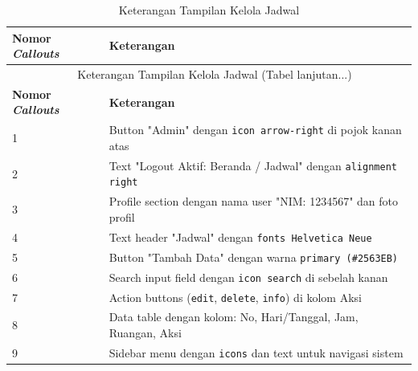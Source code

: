 \begin{enumerate}
	      {
		      \fontsize{10}{13}\selectfont
		      \begin{longtable}{p{4cm} p{9cm}}
			      \caption{Keterangan Tampilan Kelola Jadwal}
			      \label{tab:ui-jadwal}                                                                                           \\
			      \hline
			      \textbf{Nomor \textit{Callouts}} & \textbf{Keterangan}                                                          \\
			      \hline
			      \endfirsthead
			      \multicolumn{2}{c}{\normalsize\tablename\ \textbf{\thetable}\ {Keterangan Tampilan Kelola Jadwal} \space (Tabel lanjutan...)}       \\
			      \hline
			      \textbf{Nomor \textit{Callouts}} & \textbf{Keterangan}                                                          \\
			      \hline
			      \endhead
						\hline
		      \endfoot

			      1                                & Button "Admin" dengan \texttt{icon arrow-right} di pojok kanan atas          \\
			      2                                & Text "Logout Aktif: Beranda / Jadwal" dengan \texttt{alignment right}        \\
			      3                                & Profile section dengan nama user "NIM: 1234567" dan foto profil              \\
			      4                                & Text header "Jadwal" dengan \texttt{fonts Helvetica Neue}                    \\
			      5                                & Button "Tambah Data" dengan warna \texttt{primary (\#2563EB)}                \\
			      6                                & Search input field dengan \texttt{icon search} di sebelah kanan              \\
			      7                                & Action buttons (\texttt{edit}, \texttt{delete}, \texttt{info}) di kolom Aksi \\
			      8                                & Data table dengan kolom: No, Hari/Tanggal, Jam, Ruangan, Aksi                \\
			      9                                & Sidebar menu dengan \texttt{icons} dan text untuk navigasi sistem            \\
			      \hline
		      \end{longtable}
	      }


\end{enumerate}
